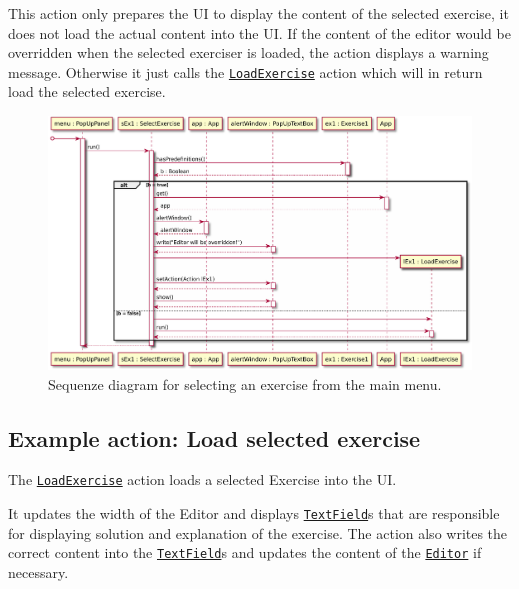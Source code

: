 This action only prepares the UI to display the content of the selected exercise, 
it does not load the actual content into the UI. If the content of the editor would 
be overridden when the selected exerciser is loaded, the action displays a warning
message. Otherwise it just calls the \texttt{\hyperref[type:edu.kit.wavelength.client.view.action.LoadExercise]{LoadExercise}} 
action which will in return load the selected exercise.

\begin{figure}[H]
	\centering
	\includegraphics[width=\textwidth]{sequenceDiagrams/selectExercise}
	\caption{Sequenze diagram for selecting an exercise from the main menu.}
\end{figure}

\subsection{Example action: Load selected exercise}
The \texttt{\hyperref[type:edu.kit.wavelength.client.view.action.LoadExercise]{LoadExercise}} 
action loads a selected Exercise into the UI.

It updates the width of the Editor and displays \texttt{\hyperref[type:edu.kit.wavelength.client.view.webui.component.TextField]{TextField}}s 
that are responsible for displaying solution and explanation of the exercise.
The action also writes the correct content into the \texttt{\hyperref[type:edu.kit.wavelength.client.view.webui.component.TextField]{TextField}}s and updates the content of the \texttt{\hyperref[type:edu.kit.wavelength.client.view.webui.component.Editor]{Editor}} if necessary.

